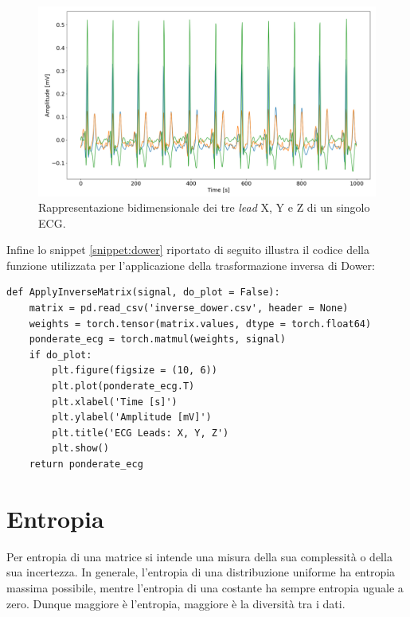 \documentclass[12pt,italian]{report}
\begin{document}
	\begin{figure}[H]
		\centering
		\includegraphics[width=1\textwidth]{immagini/frank2d.png}
		\captionsetup{justification=centering}
		\caption{Rappresentazione bidimensionale dei tre \textit{lead} X, Y e Z di un singolo ECG.}
		\label{fig:frank2d}
	\end{figure}
	
	Infine lo snippet \ref{snippet:dower} riportato di seguito illustra il codice della funzione utilizzata per l'applicazione della trasformazione inversa di Dower:
	
	\lstset{language=Python}
	\begin{lstlisting}[aboveskip=15pt, belowskip=15pt, basicstyle=\fontsize{8}{10}\selectfont, keywordstyle=\color{blue}, breaklines=true, label=snippet:dower]
def ApplyInverseMatrix(signal, do_plot = False):
    matrix = pd.read_csv('inverse_dower.csv', header = None)
    weights = torch.tensor(matrix.values, dtype = torch.float64)
    ponderate_ecg = torch.matmul(weights, signal)
    if do_plot:
        plt.figure(figsize = (10, 6))
        plt.plot(ponderate_ecg.T)
        plt.xlabel('Time [s]')
        plt.ylabel('Amplitude [mV]')
        plt.title('ECG Leads: X, Y, Z')
        plt.show()
    return ponderate_ecg
	\end{lstlisting}
	
	
	\section{Entropia}
	\label{sec:entropia}
	
	Per entropia di una matrice si intende una misura della sua complessità o della sua incertezza. In generale, l’entropia di una distribuzione uniforme ha entropia massima possibile, mentre l'entropia di una costante ha sempre entropia uguale a zero. Dunque maggiore è l’entropia, maggiore è la diversità tra i dati.
	
\end{document}

